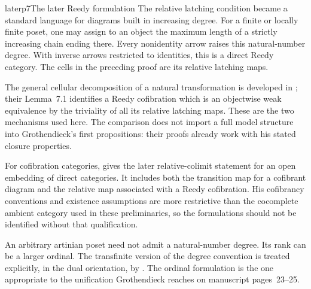 \begin{dcomment}{later}{p7}{The later Reedy formulation}
The relative latching condition became a standard language for diagrams built in increasing degree. For a finite or locally finite poset, one may assign to an object the maximum length of a strictly increasing chain ending there. Every nonidentity arrow raises this natural-number degree. With inverse arrows restricted to identities, this is a direct Reedy category. The cells in the preceding proof are its relative latching maps.

The general cellular decomposition of a natural transformation is developed in \citet[Proposition~6.3]{RiehlVerity2014Reedy}; their Lemma~7.1 identifies a Reedy cofibration which is an objectwise weak equivalence by the triviality of all its relative latching maps. These are the two mechanisms used here. The comparison does not import a full model structure into Grothendieck's first propositions: their proofs already work with his stated closure properties.

For cofibration categories, \citet[Theorem~9.4.1(1)(a,b)]{RadulescuBanu2009} gives the later relative-colimit statement for an open embedding of direct categories. It includes both the transition map for a cofibrant diagram and the relative map associated with a Reedy cofibration. His cofibrancy conventions and existence assumptions are more restrictive than the cocomplete ambient category used in these preliminaries, so the formulations should not be identified without that qualification.

An arbitrary artinian poset need not admit a natural-number degree. Its rank can be a larger ordinal. The transfinite version of the degree convention is treated explicitly, in the dual orientation, by \citet[Definition~4.6 and Theorem~4.7]{Shulman2015Reedy}. The ordinal formulation is the one appropriate to the unification Grothendieck reaches on manuscript pages~23--25.
\end{dcomment}


